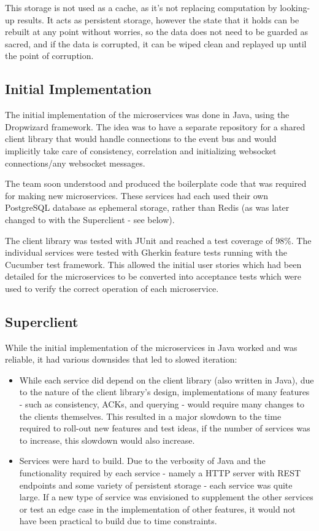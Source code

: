 \documentclass{l3proj}
\begin{document}
This storage is not used as a cache, as it's not replacing computation by looking-up results. It acts as persistent storage, however the state that it holds can be rebuilt at any point without worries, so the data does not need to be guarded as sacred, and if the data is corrupted, it can be wiped clean and replayed up until the point of corruption.

\subsection{Initial Implementation}
The initial implementation of the microservices was done in Java, using the Dropwizard framework. The idea was to have a separate repository for a shared client library that would handle connections to the event bus and would implicitly take care of consistency, correlation and initializing websocket connections/any websocket messages.

The team soon understood and produced the boilerplate code that was required for making new microservices. These services had each used their own PostgreSQL database as ephemeral storage, rather than Redis (as was later changed to with the Superclient - see below).

The client library was tested with JUnit and reached a test coverage of 98\%. The individual services were tested with Gherkin feature tests running with the Cucumber test framework. This allowed the initial user stories which had been detailed for the microservices to be converted into acceptance tests which were used to verify the correct operation of each microservice.

\subsection{Superclient}
While the initial implementation of the microservices in Java worked and was reliable, it had various downsides that led to slowed iteration:

\begin{itemize}
    \item While each service did depend on the client library (also written in Java), due to the nature of the client library's design, implementations of many features - such as consistency, ACKs, and querying - would require many changes to the clients themselves. This resulted in a major slowdown to the time required to roll-out new features and test ideas, if the number of services was to increase, this slowdown would also increase.
    \item Services were hard to build. Due to the verbosity of Java and the functionality required by each service - namely a HTTP server with REST endpoints and some variety of persistent storage - each service was quite large. If a new type of service was envisioned to supplement the other services or test an edge case in the implementation of other features, it would not have been practical to build due to time constraints.
\end{itemize}
\end{document}
